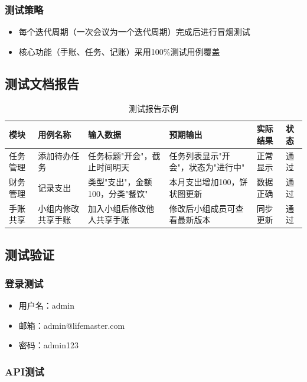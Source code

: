 \documentclass[a4paper]{article}
\begin{document}
\subsubsection{测试策略}

\begin{itemize}
    \item 每个迭代周期（一次会议为一个迭代周期）完成后进行冒烟测试
    \item 核心功能（手账、任务、记账）采用100\%测试用例覆盖
\end{itemize}

\subsection{测试文档报告}

\begin{table}[H]
\centering
\begin{tabular}{|l|l|l|l|l|l|}
\hline
\textbf{模块} & \textbf{用例名称} & \textbf{输入数据} & \textbf{预期输出} & \textbf{实际结果} & \textbf{状态} \\
\hline
任务管理 & 添加待办任务 & 任务标题"开会"，截止时间明天 & 任务列表显示"开会"，状态为"进行中" & 正常显示 & 通过 \\
\hline
财务管理 & 记录支出 & 类型"支出"，金额100，分类"餐饮" & 本月支出增加100，饼状图更新 & 数据正确 & 通过 \\
\hline
手账共享 & 小组内修改共享手账 & 加入小组后修改他人共享手账 & 修改后小组成员可查看最新版本 & 同步更新 & 通过 \\
\hline
\end{tabular}
\caption{测试报告示例}
\end{table}

\subsection{测试验证}

\subsubsection{登录测试}

\begin{itemize}
    \item 用户名：admin
    \item 邮箱：admin@lifemaster.com
    \item 密码：admin123
\end{itemize}

\subsubsection{API测试}
\end{document}
